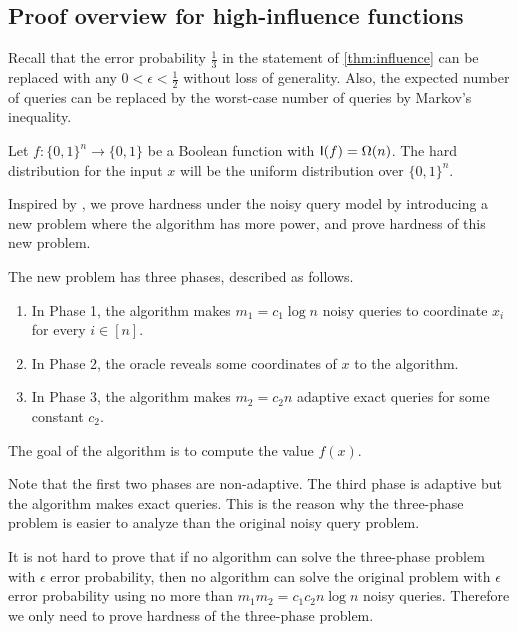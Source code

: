 \subsection{Proof overview for high-influence functions}
\label{sec:influence:overview}
Recall that the error probability $\frac 13$ in the statement of \cref{thm:influence} can be replaced with any $0<\epsilon<\frac 12$ without loss of generality. Also, the expected number of queries can be replaced by the worst-case number of queries by Markov's inequality.

Let $f: \{0, 1\}^n \rightarrow \{0, 1\}$ be a Boolean function with $\operatorname{\mathsf{I}}(f) = \Omega(n)$. The hard distribution for the input $x$ will be the uniform distribution over $\{0, 1\}^n$.

Inspired by \cite{feige1994computing}, we prove hardness under the noisy query model by introducing a new problem where the algorithm has more power, and prove hardness of this new problem.

The new problem has three phases, described as follows.
\begin{enumerate}
  \item \label{item:sec:influence:overview:phase-1} In Phase 1, the algorithm makes $m_1=c_1\log n$ noisy queries to coordinate $x_i$ for every $i \in [n]$.
  \item \label{item:sec:influence:overview:phase-2} In Phase 2, the oracle reveals some coordinates of $x$ to the algorithm.
  \item \label{item:sec:influence:overview:phase-3} In Phase 3, the algorithm makes $m_2=c_2 n$ adaptive exact queries for some constant $c_2$.
\end{enumerate}
The goal of the algorithm is to compute the value $f(x)$.

Note that the first two phases are non-adaptive. The third phase is adaptive but the algorithm makes exact queries. This is the reason why the three-phase problem is easier to analyze than the original noisy query problem.

It is not hard to prove that if no algorithm can solve the three-phase problem with $\epsilon$ error probability, then no algorithm can solve the original problem with $\epsilon$ error probability using no more than $m_1 m_2 = c_1 c_2 n \log n$ noisy queries.
Therefore we only need to prove hardness of the three-phase problem.




